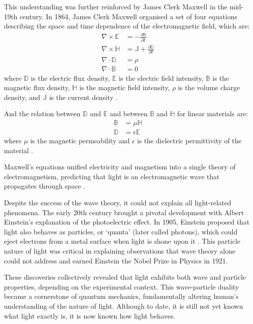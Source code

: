 This understanding was further reinforced by James Clerk Maxwell in the mid-19th century. In 1864, James Clerk Maxwell organised a set of four equations describing the space and time dependence of the electromagnetic field, which are:
\begin{align}
  \nabla \times \mathbb{E} & = -\frac{\partial \mathbb{B}}{\partial t}             \label{eq:maxwell1} \\
  \nabla \times \mathbb{H} & = \mathbb{J} + \frac{\partial \mathbb{D}}{\partial t} \label{eq:maxwell2} \\
  \nabla \cdot \mathbb{D}  & = \rho                                                \label{eq:maxwell3} \\
  \nabla \cdot \mathbb{B}  & = 0 \label{eq:maxwell4}
\end{align}
where $\mathbb{D}$ is the electric flux density, $\mathbb{E}$ is the electric field intensity, $\mathbb{B}$ is the magnetic flux density, $\mathbb{H}$ is the magnetic field intensity, $\rho$ is the volume charge density, and $\mathbb{J}$ is the current density \cite{Daintith2009}.

And the relation between $\mathbb{D}$ and $\mathbb{E}$ and between $\mathbb{B}$ and $\mathbb{H}$ for linear materials are:
\begin{align}
  \mathbb{B} & = \mu \mathbb{H}      \\
  \mathbb{D} & = \epsilon \mathbb{E}
\end{align}
where $\mu$ is the magnetic permeability and $\epsilon$ is the dielectric permittivity of the material \cite{Wilkinson2017}.

Maxwell's equations unified electricity and magnetism into a single theory of electromagnetism, predicting that light is an electromagnetic wave that propagates through space \cite{Maxwell1865}.

Despite the success of the wave theory, it could not explain all light-related phenomena. The early 20th century brought a pivotal development with Albert Einstein's explanation of the photoelectric effect. In 1905, Einstein proposed that light also behaves as particles, or `quanta' (later called photons), which could eject electrons from a metal surface when light is shone upon it \cite{Einstein1905}. This particle nature of light was critical in explaining observations that wave theory alone could not address and earned Einstein the Nobel Prize in Physics in 1921.

These discoveries collectively revealed that light exhibits both wave and particle properties, depending on the experimental context. This wave-particle duality became a cornerstone of quantum mechanics, fundamentally altering human's understanding of the nature of light. Although to date, it is still not yet known what light exactly is, it is now known how light behaves.

